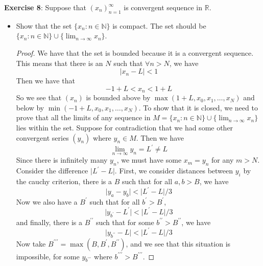 \documentclass{article}
\begin{document}
\textbf{Exercise 8}: Suppose that $(x_{n})_{n = 1}^{\infty}$ is convergent sequence in $\mathbb{R}$.
    \begin{itemize}
        \item Show that the set $\{x_{n} : n \in\mathbb{N}\}$ is compact. The set should be $\{x_{n} : n \in\mathbb{N}\} \cup \{\lim_{n \to \infty}x_{n}\}$.
            \begin{proof}
                We have that the set is bounded because it is a convergent sequence. This means that there is an $N$ such that $\forall n > N$, we have
                    \begin{equation*}
                        \lvert x_{n} - L \rvert < 1
                    \end{equation*}
                Then we have that 
                    \begin{equation*}
                        - 1 + L < x_{n} < 1 + L
                    \end{equation*}
                So we see that $(x_{n})$ is bounded above by $\max(1 + L, x_{0}, x_{1}, \ldots, x_{N})$ and below by $\min(-1 + L, x_{0}, x_{1}, \ldots, x_{N})$. To show that it is closed, we need to prove that all the limits of any sequence in $M = \{x_{n} : n \in \mathbb{N}\} \cup \{\lim_{n \to \infty}x_{n}\}$ lies within the set. Suppose for contradiction that we had some other convergent series $(y_{n})$ where $y_{n} \in M$. Then we have 
                    \begin{equation*}
                        \lim_{n \to \infty} y_{n} = L^{\prime} \neq L
                    \end{equation*}
                Since there is infinitely many $y_{n}$, we must have some $x_{m} = y_{n}$ for any $m > N$. Consider the difference $\lvert L^{\prime} - L \rvert$. First, we consider distances between $y_{i}$ by the cauchy criterion, there is a $B$ such that for all $a, b > B$, we have 
                    \begin{equation*}
                        \lvert y_{a} - y_{b} \rvert < \lvert L^{\prime} - L \rvert / 3
                    \end{equation*}
                Now we also have a $B^{\prime}$ such that for all $b^{\prime} > B^{\prime}$, 
                    \begin{equation*}
                        \lvert y_{b^{\prime}} - L^{\prime} \rvert < \lvert L^{\prime} - L \rvert /3
                    \end{equation*}
                and finally, there is a $B^{\prime\prime}$ such that for some $b^{\prime\prime} > B^{\prime\prime}$, we have
                    \begin{equation*}
                        \lvert y_{b^{\prime\prime}} - L \rvert < \lvert L^{\prime} - L \rvert / 3
                    \end{equation*}
                Now take $B^{\prime\prime\prime} = \max(B, B^{\prime}, B^{\prime\prime})$, and we see that this situation is impossible, for some $y_{b^{\prime\prime\prime}}$ where $b^{\prime\prime\prime} > B^{\prime\prime\prime}$.
            \end{proof}


\end{itemize}
\end{document}
